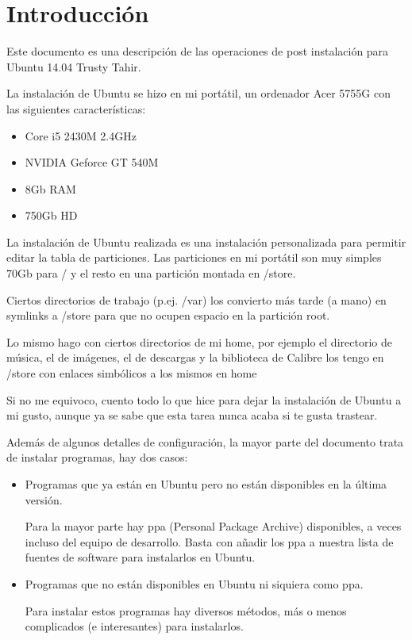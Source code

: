 \section{Introducción}\label{intro}

Este documento es una descripción de las operaciones de post instalación
para Ubuntu 14.04 Trusty Tahir.

La instalación de Ubuntu se hizo en mi portátil, un ordenador Acer 5755G
con las siguientes características:

\begin{itemize}
\item
  Core i5 2430M 2.4GHz
\item
  NVIDIA Geforce GT 540M
\item
  8Gb RAM
\item
  750Gb HD
\end{itemize}

La instalación de Ubuntu realizada es una instalación personalizada para
permitir editar la tabla de particiones. Las particiones en mi portátil
son muy simples 70Gb para / y el resto en una partición montada en
/store.

Ciertos directorios de trabajo (p.ej. /var) los convierto más tarde (a
mano) en symlinks a /store para que no ocupen espacio en la partición
root.

Lo mismo hago con ciertos directorios de mi home, por ejemplo el
directorio de música, el de imágenes, el de descargas y la biblioteca de
Calibre los tengo en /store con enlaces simbólicos a los mismos en home

Si no me equivoco, cuento todo lo que hice para dejar la instalación de
Ubuntu a mi gusto, aunque ya se sabe que esta tarea nunca acaba si te
gusta trastear.

Además de algunos detalles de configuración, la mayor parte del
documento trata de instalar programas, hay dos casos:

\begin{itemize}
\item
  Programas que ya están en Ubuntu pero no están disponibles en la
  última versión.

  Para la mayor parte hay ppa (Personal Package Archive) disponibles, a
  veces incluso del equipo de desarrollo. Basta con añadir los ppa a
  nuestra lista de fuentes de software para instalarlos en Ubuntu.
\item
  Programas que no están disponibles en Ubuntu ni siquiera como ppa.

  Para instalar estos programas hay diversos métodos, más o menos
  complicados (e interesantes) para instalarlos.
\end{itemize}

